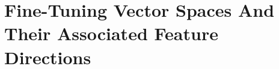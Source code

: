 



\section{Fine-Tuning Vector Spaces And Their Associated Feature Directions}\label{secFinetuning}


